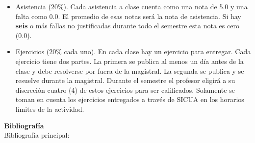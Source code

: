 \documentclass[letterpaper,10pt,onecolumn]{article}
\begin{document}
\begin{itemize}
\item Asistencia ($20\%$). Cada asistencia a clase cuenta como una
  nota de 5.0 y una falta como 0.0. El promedio de esas notas ser\'a
  la nota de asistencia. 
  Si hay {\bf seis} o m\'as fallas no justificadas durante todo el
  semestre esta nota es cero (0.0).
\item Ejercicios ($20\%$ cada uno). En cada clase hay un ejercicio para
  entregar. Cada ejercicio tiene dos partes. 
  La primera se publica al menos un d\'ia antes de la clase y debe
  resolverse por fuera de la magistral. 
  La segunda se publica y se resuelve durante la magistral.
  Durante el semestre el profesor eligir\'a a su discreci\'on cuatro (4)
  de estos ejercicios para ser calificados.
  Solamente se toman en cuenta los ejercicios entregados a trav\'es de
  SICUA en los horarios l\'imites de la actividad.
\end{itemize}

\vspace*{0.5cm} 

\newpage
{}
\noindent\textbf{\large {} \quad
  Bibliograf\'ia}\\[-0.2cm] 



\noindent\normalsize Bibliograf\'ia principal:
\end{document}
